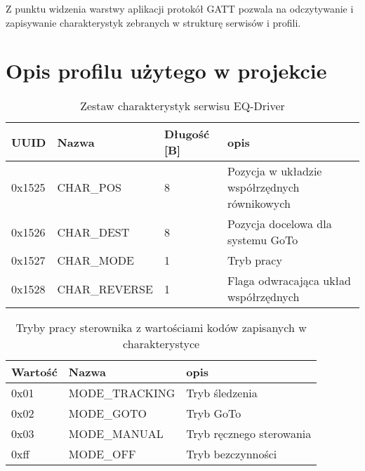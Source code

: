 Z punktu widzenia warstwy aplikacji protokół GATT pozwala na odczytywanie
i zapisywanie charakterystyk zebranych w strukturę serwisów i profili.

\section{Opis profilu użytego w projekcie}

\begin{table}[t]

\begin{tabularx}{\linewidth}{|l|l|l|X|}

\hline UUID & Nazwa & Długość [B] & opis \\

\hline 0x1525 & CHAR\_POS & 8 & Pozycja w układzie współrzędnych równikowych \\

\hline 0x1526 & CHAR\_DEST & 8 & Pozycja docelowa dla systemu GoTo \\

\hline 0x1527 & CHAR\_MODE & 1 & Tryb pracy \\

\hline 0x1528 & CHAR\_REVERSE & 1 & Flaga odwracająca układ współrzędnych \\

\hline \end{tabularx}

\caption{Zestaw charakterystyk serwisu EQ-Driver}

\label{tab:eq-driver-service}

\end{table}

\begin{table}[t]

\begin{tabularx}{\linewidth}{|l|l|X|}

\hline Wartość & Nazwa &  opis \\

\hline 0x01 & MODE\_TRACKING & Tryb śledzenia \\

\hline 0x02 & MODE\_GOTO & Tryb GoTo \\

\hline 0x03 & MODE\_MANUAL & Tryb ręcznego sterowania \\

\hline 0xff & MODE\_OFF & Tryb bezczynności \\

\hline \end{tabularx}

\caption{Tryby pracy sterownika z wartościami kodów zapisanych
w charakterystyce}

\label{tab:eq-driver-modes}

\end{table}

